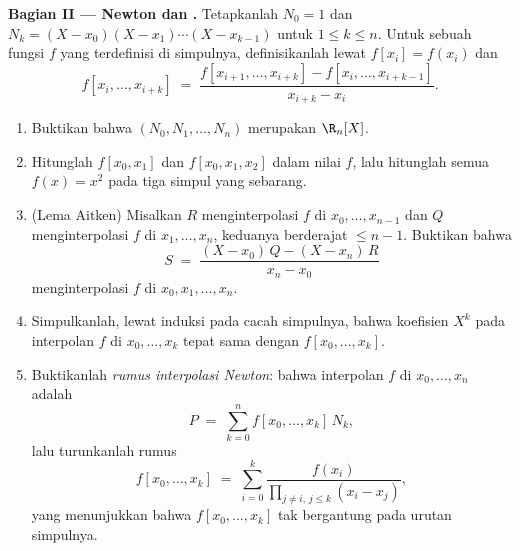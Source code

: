 \begin{problem}
\medskip
\noindent\textbf{Bagian II ---  Newton dan .} Tetapkanlah $N_0 = 1$ dan $N_k = (X - x_0)(X - x_1) \cdots
(X - x_{k-1})$ untuk $1 \leq k \leq n$. Untuk sebuah fungsi $f$ yang terdefinisi
di simpulnya, definisikanlah \emph{} lewat
$f[x_i] = f(x_i)$ dan
\[
f[x_i, \dots, x_{i+k}] \;=\;
\frac{f[x_{i+1}, \dots, x_{i+k}] - f[x_i, \dots, x_{i+k-1}]}
{x_{i+k} - x_i} .
\]
\begin{enumerate}[resume]
  \item Buktikan bahwa $(N_0, N_1, \dots, N_n)$ merupakan 
        $\R_n[X]$.
  \item Hitunglah $f[x_0, x_1]$ dan $f[x_0, x_1, x_2]$ dalam
        nilai $f$, lalu hitunglah semua 
        $f(x) = x^2$ pada tiga simpul yang sebarang.
  \item (Lema Aitken) Misalkan $R$ menginterpolasi $f$ di $x_0, \dots,
        x_{n-1}$ dan $Q$ menginterpolasi $f$ di $x_1, \dots, x_n$,
        keduanya berderajat $\leq n - 1$. Buktikan bahwa
        \[
        S \;=\; \frac{(X - x_0)\,Q - (X - x_n)\,R}{x_n - x_0}
        \]
        menginterpolasi $f$ di $x_0, x_1, \dots, x_n$.
  \item Simpulkanlah, lewat induksi pada cacah simpulnya, bahwa
        koefisien $X^{k}$ pada interpolan $f$ di $x_0,
        \dots, x_k$ tepat sama dengan $f[x_0, \dots, x_k]$.
  \item Buktikanlah \emph{rumus interpolasi Newton}: bahwa
        interpolan $f$ di $x_0, \dots, x_n$ adalah
        \[
        P \;=\; \sum_{k=0}^{n} f[x_0, \dots, x_k]\, N_k ,
        \]
        lalu turunkanlah rumus 
        \[
        f[x_0, \dots, x_k] \;=\; \sum_{i=0}^{k}
        \frac{f(x_i)}{\prod_{j \neq i,\, j \leq k} (x_i - x_j)} ,
        \]
        yang menunjukkan bahwa $f[x_0, \dots, x_k]$ tak bergantung pada
        urutan simpulnya.
\end{enumerate}


\end{problem}
